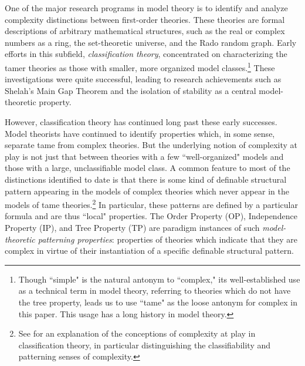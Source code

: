 \documentclass{article}
\theoremstyle{definition}
\theoremstyle{definition}
\theoremstyle{definition}
\begin{document}
One of the major research programs in model theory is to identify and analyze complexity distinctions between first-order theories. These theories are formal descriptions of arbitrary mathematical structures, such as the real or complex numbers as a ring, the set-theoretic universe, and the Rado random graph. Early efforts in this subfield, \textit{classification theory}, concentrated on characterizing the tamer theories as those with smaller, more organized model classes.\footnote{Though ``simple" is the natural antonym to ``complex," its well-established use as a technical term in model theory, referring to theories which do not have the tree property, leads us to use ``tame" as the loose antonym for complex in this paper. This usage has a long history in model theory. %
} These investigations were quite successful, leading to research achievements such as Shelah's Main Gap Theorem and the isolation of stability as a central model-theoretic property.

However, classification theory has continued long past these early successes. Model theorists have continued to identify properties which, in some sense, separate tame from complex theories. But the underlying notion of complexity at play is not just that between theories with a few ``well-organized" models and those with a large, unclassifiable model class. A common feature to most of the distinctions identified to date is that there is some kind of definable structural pattern appearing in the models of complex theories which never appear in the models of tame theories.\footnote{See \cite{day2025complexity} for an explanation of the conceptions of complexity at play in classification theory, in particular distinguishing the classifiability and patterning senses of complexity.} In particular, these patterns are defined by a particular formula and are thus ``local" properties. The Order Property (OP), Independence Property (IP), and Tree Property (TP) are paradigm instances of such \textit{model-theoretic patterning properties}: properties of theories which indicate that they are complex in virtue of their instantiation of a specific definable structural pattern.

\end{document}
